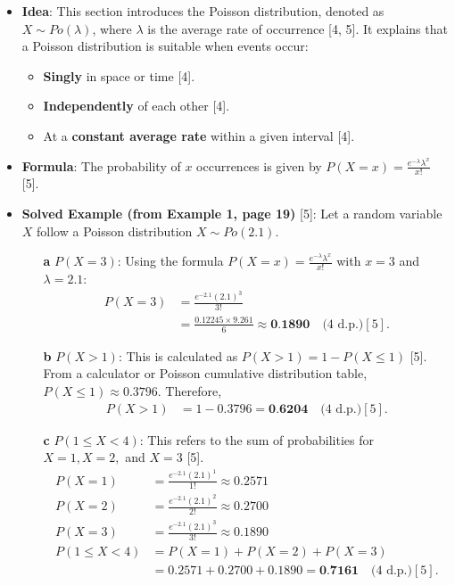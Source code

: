 \documentclass[12pt]{article}
\begin{document}
\begin{itemize}
    \item \textbf{Idea}: This section introduces the Poisson distribution, denoted as $X \sim Po(\lambda)$, where $\lambda$ is the average rate of occurrence [4, 5]. It explains that a Poisson distribution is suitable when events occur:
    \begin{itemize}
        \item \textbf{Singly} in space or time [4].
        \item \textbf{Independently} of each other [4].
        \item At a \textbf{constant average rate} within a given interval [4].
    \end{itemize}
    \item \textbf{Formula}: The probability of $x$ occurrences is given by $P(X=x) = \frac{e^{-\lambda}\lambda^x}{x!}$ [5].

    \item \textbf{Solved Example (from Example 1, page 19)} [5]:
    Let a random variable $X$ follow a Poisson distribution $X \sim Po(2.1)$.
    \begin{enumerate}
        \item[\textbf{a}] $P(X=3)$:
        Using the formula $P(X=x) = \frac{e^{-\lambda}\lambda^x}{x!}$ with $x=3$ and $\lambda=2.1$:
        \begin{align*}
        P(X=3) &= \frac{e^{-2.1} (2.1)^3}{3!} \\
        &= \frac{0.12245 \times 9.261}{6} \approx \textbf{0.1890} \quad \text{(4 d.p.)} [5].
        \end{align*}
        \item[\textbf{b}] $P(X > 1)$:
        This is calculated as $P(X > 1) = 1 - P(X \le 1)$ [5].
        From a calculator or Poisson cumulative distribution table, $P(X \le 1) \approx 0.3796$.
        Therefore,
        \begin{align*}
        P(X > 1) &= 1 - 0.3796 = \textbf{0.6204} \quad \text{(4 d.p.)} [5].
        \end{align*}
        \item[\textbf{c}] $P(1 \le X < 4)$:
        This refers to the sum of probabilities for $X=1, X=2,$ and $X=3$ [5].
        \begin{align*}
        P(X=1) &= \frac{e^{-2.1} (2.1)^1}{1!} \approx 0.2571 \\
        P(X=2) &= \frac{e^{-2.1} (2.1)^2}{2!} \approx 0.2700 \\
        P(X=3) &= \frac{e^{-2.1} (2.1)^3}{3!} \approx 0.1890 \\
        P(1 \le X < 4) &= P(X=1) + P(X=2) + P(X=3) \\
        &= 0.2571 + 0.2700 + 0.1890 = \textbf{0.7161} \quad \text{(4 d.p.)} [5].
        \end{align*}
    \end{enumerate}
\end{itemize}
\end{document}
